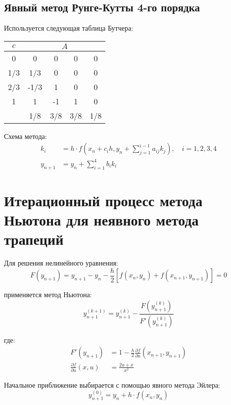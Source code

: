 \documentclass[12pt,a4paper]{article}
\begin{document}
\subsection{Явный метод Рунге-Кутты 4-го порядка}
Используется следующая таблица Бутчера:

\begin{center}
\begin{tabular}{c|cccc}
$c$ & \multicolumn{4}{c}{$A$} \\
\hline
0   & 0    & 0    & 0    & 0   \\
1/3 & 1/3  & 0    & 0    & 0   \\
2/3 & -1/3 & 1    & 0    & 0   \\
1   & 1    & -1   & 1    & 0   \\
\hline
    & 1/8  & 3/8  & 3/8  & 1/8 \\
\end{tabular}
\end{center}

Схема метода:
\begin{align*}
k_i &= h \cdot f\left(x_n + c_i h, y_n + \sum_{j=1}^{i-1} a_{ij} k_j\right), \quad i = 1,2,3,4 \\
y_{n+1} &= y_n + \sum_{i=1}^4 b_i k_i
\end{align*}

\section{Итерационный процесс метода Ньютона для неявного метода трапеций}
Для решения нелинейного уравнения:
\begin{equation*}
F(y_{n+1}) = y_{n+1} - y_n - \frac{h}{2}[f(x_n, y_n) + f(x_{n+1}, y_{n+1})] = 0
\end{equation*}

применяется метод Ньютона:
\begin{equation*}
y_{n+1}^{(k+1)} = y_{n+1}^{(k)} - \frac{F(y_{n+1}^{(k)})}{F'(y_{n+1}^{(k)})}
\end{equation*}

где:
\begin{align*}
F'(y_{n+1}) &= 1 - \frac{h}{2} \frac{\partial f}{\partial u}(x_{n+1}, y_{n+1}) \\
\frac{\partial f}{\partial u}(x, u) &= \frac{2u + x}{x^2}
\end{align*}

Начальное приближение выбирается с помощью явного метода Эйлера:
\begin{equation*}
y_{n+1}^{(0)} = y_n + h \cdot f(x_n, y_n)
\end{equation*}
\end{document}
